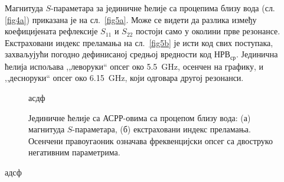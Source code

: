 \documentclass[main.tex]{subfiles}
\begin{document}
Магнитуда $S$-параметара за јединичне ћелије са процепима близу вода (сл. \ref{fig4a}) приказана је на сл.~\ref{fig5a}. Може се видети да разлика између коефицијената рефлексије $S_{11}$ и $S_{22}$ постоји само у околини прве резонансе. Екстраховани индекс преламања на сл.~\ref{fig5b} је исти код свих поступака, захваљујући погодно дефинисаној средњој вредности код $НРВ_{ср}$. Јединична ћелија испољава ,,леворуки`` опсег око \SI{5.5}{\giga\hertz}, осенчен на графику, и ,,десноруки`` опсег око \SI{6.15}{\giga\hertz}, који одговара другој резонанси.
\begin{figure}[!t]
\hfill
{}
\caption{Јединичне ћелије са АСРР-овима са процепом близу вода: (а) магнитуда $S$-параметара, (б) екстраховани индекс преламања. Осенчени правоугаоник означава фреквенцијски опсег са двоструко негативним параметрима.}
\label{fig5}асдф
\end{figure}адсф 
\end{document}
